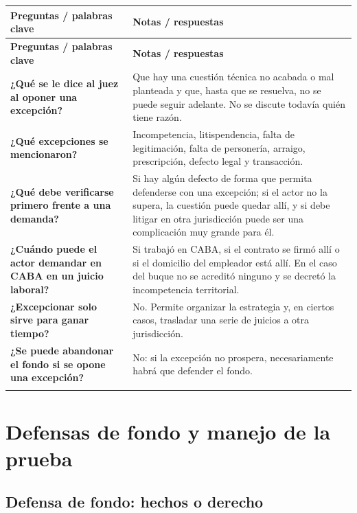 \documentclass[12pt,oneside]{book}
\newenvironment{cornell}{%
  \begin{longtable}{>{\raggedright\arraybackslash}p{0.26\textwidth}>{\raggedright\arraybackslash}p{0.64\textwidth}}
  \toprule
  \textbf{Preguntas / palabras clave} & \textbf{Notas / respuestas} \\
  \midrule
  \endfirsthead
  \toprule
  \textbf{Preguntas / palabras clave} & \textbf{Notas / respuestas} \\
  \midrule
  \endhead
}{%
  \bottomrule
  \end{longtable}
}
\newcommand{\cornellresumen}[1]{%
  \midrule
  \multicolumn{2}{p{\dimexpr0.90\textwidth+2\tabcolsep\relax}}{\textbf{Resumen:} #1} \\
}
\begin{document}
\begin{cornell}
\textbf{¿Qué se le dice al juez al oponer una excepción?} &
Que hay una cuestión técnica no acabada o mal planteada y que, hasta que se resuelva, no se puede seguir adelante. No se discute todavía quién tiene razón. \\
\addlinespace
\textbf{¿Qué excepciones se mencionaron?} &
Incompetencia, litispendencia, falta de legitimación, falta de personería, arraigo, prescripción, defecto legal y transacción. \\
\addlinespace
\textbf{¿Qué debe verificarse primero frente a una demanda?} &
Si hay algún defecto de forma que permita defenderse con una excepción; si el actor no la supera, la cuestión puede quedar allí, y si debe litigar en otra jurisdicción puede ser una complicación muy grande para él. \\
\addlinespace
\textbf{¿Cuándo puede el actor demandar en CABA en un juicio laboral?} &
Si trabajó en CABA, si el contrato se firmó allí o si el domicilio del empleador está allí. En el caso del buque no se acreditó ninguno y se decretó la incompetencia territorial. \\
\addlinespace
\textbf{¿Excepcionar solo sirve para ganar tiempo?} &
No. Permite organizar la estrategia y, en ciertos casos, trasladar una serie de juicios a otra jurisdicción. \\
\addlinespace
\textbf{¿Se puede abandonar el fondo si se opone una excepción?} &
No: si la excepción no prospera, necesariamente habrá que defender el fondo. \\
\cornellresumen{Las excepciones previas plantean una cuestión técnica que detiene el avance del proceso y no discuten quién tiene razón. Se verifican primero, pueden ordenar la estrategia y trasladar juicios (como en el caso de la incompetencia territorial), pero nunca eximen de defender el fondo.}
\end{cornell}

\chapter[Defensas de fondo y manejo de la prueba]{Defensas de fondo y manejo de la prueba}

\section{Defensa de fondo: hechos o derecho}
\end{document}

